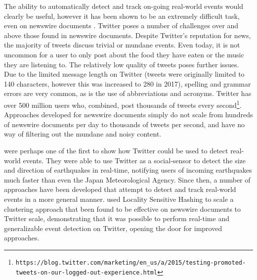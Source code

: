 The ability to automatically detect and track on-going real-world events would clearly be useful, however it has been shown to be an extremely difficult task, even on newswire documents \citep{Allan:2000:FSD:354756.354843}.
Twitter poses a number of challenges over and above those found in newswire documents.
Despite Twitter's reputation for news, the majority of tweets discuss trivial or mundane events.
Even today, it is not uncommon for a user to only post about the food they have eaten or the music they are listening to.
The relatively low quality of tweets poses further issues.
Due to the limited message length on Twitter (tweets were originally limited to 140 characters, however this was increased to 280 in 2017), spelling and grammar errors are very common, as is the use of abbreviations and acronyms.
Twitter has over 500 million users who, combined, post thousands of tweets every second\footnote{\texttt{https://blog.twitter.com/marketing/en\_us/a/2015/testing-promoted-\\tweets-on-our-logged-out-experience.html}}.
Approaches developed for newswire documents simply do not scale from hundreds of newswire documents per day to thousands of tweets per second, and have no way of filtering out the mundane and noisy content.

\cite{Sakaki:2010:EST:1772690.1772777} were perhaps one of the first to show how Twitter could be used to detect real-world events.
They were able to use Twitter as a social-sensor to detect the size and direction of earthquakes in real-time, notifying users of incoming earthquakes much faster than even the Japan Meteorological Agency.
Since then, a number of approaches have been developed that attempt to detect and track real-world events in a more general manner.
\cite{Petrovic10} used Locality Sensitive Hashing to scale a clustering approach that been found to be effective on newswire documents to Twitter scale, demonstrating that it was possible to perform real-time and generalizable event detection on Twitter, opening the door for improved approaches.

